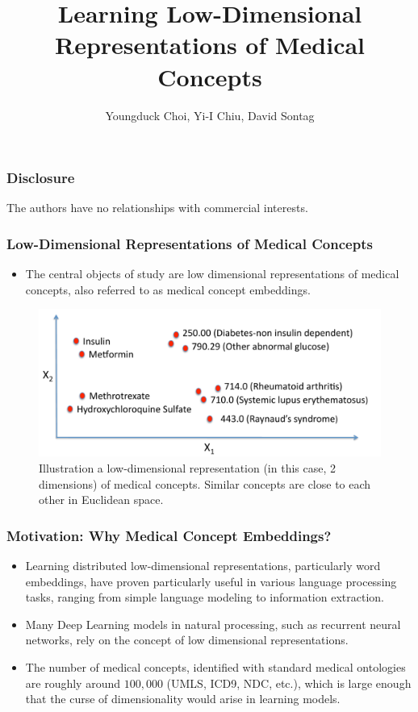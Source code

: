\documentclass{beamer}
\title[LLDRMC]{Learning Low-Dimensional Representations
of Medical Concepts \\
}
\author[Choi et al.]
{Youngduck Choi, Yi-I Chiu, David Sontag }
\institute[CIMS]{Courant Institute of Mathematical 
Sciences, New York University}
\begin{document}
 
\frame{\titlepage} 

\begin{frame}
\frametitle{Disclosure}
\begin{center}
The authors have no relationships 
with commercial interests.
\end{center}
\end{frame}

\begin{frame}
\frametitle{Low-Dimensional Representations of 
Medical Concepts}
\begin{center}
\begin{itemize}
\item The central objects of study are
low dimensional representations of medical 
concepts, also referred to as medical concept
embeddings.
\end{itemize}
\bigskip

\begin{figure}[t]
    \centering 
    \includegraphics[width=.6\linewidth]{figs/illustration_of_embeddings.pdf}
    \caption{\centering 
\scriptsize Illustration a low-dimensional representation (in
      this case, 2 dimensions) of medical concepts. Similar concepts are close to each other in Euclidean space.
\label{fig:illustration_of_embeddings}}
\end{figure}
\end{center}
\end{frame}

\begin{frame}
\frametitle{Motivation: Why Medical Concept Embeddings?}
\begin{center}
\begin{itemize}
\item 
Learning distributed low-dimensional representations,
particularly word embeddings, 
have proven particularly useful
in various language processing tasks, ranging from
simple language modeling to information extraction.

\bigskip

\item Many Deep Learning models in natural processing,
such as recurrent neural networks, 
rely on the concept of 
low dimensional representations.

\bigskip

\item The number of medical concepts, 
identified with standard medical ontologies are
roughly around $100,000$ (UMLS, ICD9, NDC, etc.),
which is large enough that 
the curse of dimensionality would arise in 
learning models.
\end{itemize}
\end{center}
\end{frame}
\end{document}
